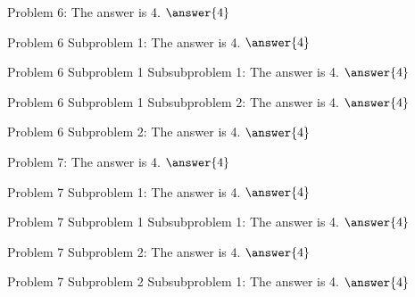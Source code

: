\documentclass{ximera}
\begin{document}
\begin{problem}\label{problem:6}
    Problem 6: The answer is 4. $\answer{4}$
    \begin{problem}\label{problem:6.1}
        Problem 6 Subproblem 1: The answer is 4. $\answer{4}$
        \begin{problem}\label{problem:6.1.1}
            Problem 6 Subproblem 1 Subsubproblem 1: The answer is 4. $\answer{4}$
        \end{problem} 
        \begin{problem}\label{problem:6.1.2}
            Problem 6 Subproblem 1 Subsubproblem 2: The answer is 4. $\answer{4}$
        \end{problem} 
    \end{problem} 
    \begin{problem}\label{problem:6.2}
        Problem 6 Subproblem 2: The answer is 4. $\answer{4}$
    \end{problem} 
\end{problem} 

\begin{problem}\label{problem:7}
    Problem 7: The answer is 4. $\answer{4}$
    \begin{problem}\label{problem:7.1}
        Problem 7 Subproblem 1: The answer is 4. $\answer{4}$
        \begin{problem}\label{problem:7.1.1}
            Problem 7 Subproblem 1 Subsubproblem 1: The answer is 4. $\answer{4}$
        \end{problem} 
    \end{problem}
    \begin{problem}\label{problem:7.2}
        Problem 7 Subproblem 2: The answer is 4. $\answer{4}$
        \begin{problem}\label{problem:7.2.1}
            Problem 7 Subproblem 2 Subsubproblem 1: The answer is 4. $\answer{4}$
        \end{problem} 
    \end{problem} 
\end{problem} 
\end{document}
